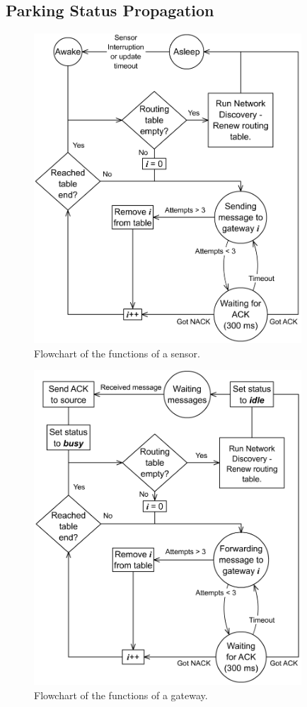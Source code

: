 \subsection{Parking Status Propagation}
\begin{figure}
    \centering
    \includegraphics[width=10cm]{images/Flowchart_Mote.png}
	\vspace{-1.5em}
    \caption{Flowchart of the functions of a sensor.}
    \vspace{-1.5em}
    \label{fig:sensor}
\end{figure}

\begin{figure}
    \centering
    \includegraphics[width=10cm]{images/Flowchart_Gateway.png}
	\vspace{-1.5em}
    \caption{Flowchart of the functions of a gateway.}
    \vspace{-1.5em}
    \label{fig:gateway}
\end{figure}

